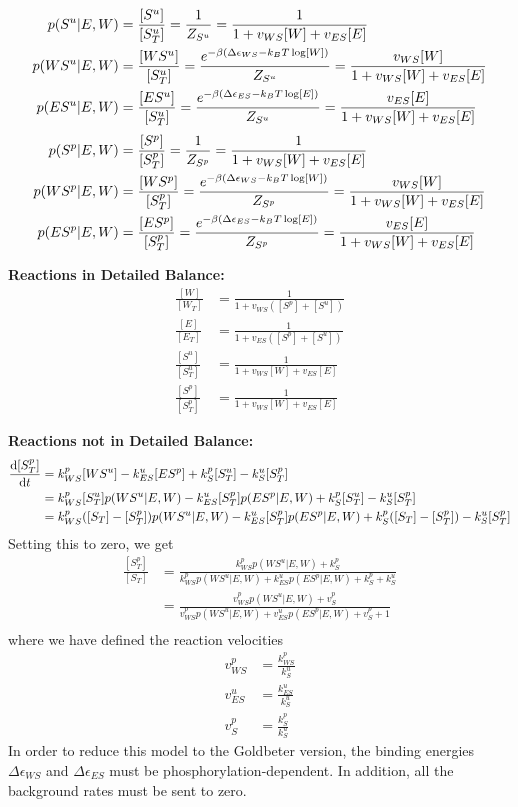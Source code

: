 \documentclass[aps,onecolumn,superscriptaddress,notitlepage]{revtex4-1}
\begin{document}
\begin{align}
p(S^u|E, W) &= \frac{[S^u]}{[S^u_T]} = \frac{1}{Z_{S^u}} = \frac{1}{1 + v_{WS}[W]+ v_{ES}[E]}\\
p(WS^u|E, W) &= \frac{[WS^u]}{[S^u_T]} = \frac{ e^{-\beta\qty(\Delta\epsilon_{WS} -k_BT \log[W])}}{Z_{S^u}} = \frac{v_{WS}[W]}{1 + v_{WS}[W]+ v_{ES}[E]}\\
p(ES^u|E, W) &= \frac{[ES^u]}{[S^u_T]} = \frac{ e^{-\beta\qty(\Delta\epsilon_{ES} -k_BT \log[E])}}{Z_{S^u}} = \frac{v_{ES}[E]}{1 + v_{WS}[W]+ v_{ES}[E]}
\end{align}
\begin{align}
p(S^p|E, W) &= \frac{[S^p]}{[S^p_T]} = \frac{1}{Z_{S^p}} = \frac{1}{1 + v_{WS}[W]+ v_{ES}[E]}\\
p(WS^p|E, W) &= \frac{[WS^p]}{[S^p_T]} = \frac{ e^{-\beta\qty(\Delta\epsilon_{WS} -k_BT \log[W])}}{Z_{S^p}} = \frac{v_{WS}[W]}{1 + v_{WS}[W]+ v_{ES}[E]}\\
p(ES^p|E, W) &= \frac{[ES^p]}{[S^p_T]} = \frac{ e^{-\beta\qty(\Delta\epsilon_{ES} -k_BT \log[E])}}{Z_{S^p}} = \frac{v_{ES}[E]}{1 + v_{WS}[W]+ v_{ES}[E]}
\end{align}

\textbf{Reactions in Detailed Balance:}
\begin{align}
\frac{[W]}{[W_T]} & = \frac{1}{1 + v_{WS}([S^p]+[S^u])}\\
\frac{[E]}{[E_T]} & = \frac{1}{1 + v_{ES}([S^p]+[S^u])}\\
\frac{[S^u]}{[S^u_T]} &= \frac{1}{1 + v_{WS}[W]+ v_{ES}[E]}\\
\frac{[S^p]}{[S^p_T]} &=  \frac{1}{1+ v_{WS}[W] + v_{ES}[E]}
\end{align}

\textbf{Reactions not in  Detailed Balance:}
\begin{align}
\dv{[S^p_T]}{t} &= k_{WS}^p[WS^u] - k_{ES}^u[ES^p] + k_S^p[S^u_T] - k_S^u[S^p_T] \\
&= k_{WS}^p[S^u_T]p(WS^u|E, W) - k_{ES}^u[S^p_T]p(ES^p|E, W) + k_S^p[S^u_T] - k_S^u[S^p_T]\\
&= k_{WS}^p([S_T]-[S^p_T])p(WS^u|E, W) - k_{ES}^u[S^p_T]p(ES^p|E, W) + k_S^p([S_T]-[S^p_T]) - k_S^u[S^p_T]
\end{align}
Setting this to zero, we get
\begin{align}
\frac{[S_T^p]}{[S_T]} &= \frac{k_{WS}^p p(WS^u|E,W) + k_S^p}{k_{WS}^p p(WS^u|E,W) + k_{ES}^u p(ES^p|E,W) + k_S^p + k_S^u}\\
 &= \frac{v_{WS}^p p(WS^u|E,W) + v_S^p}{v_{WS}^p p(WS^u|E,W) + v_{ES}^u p(ES^p|E,W) + v_S^p + 1}\\
\end{align}
where we have defined the reaction velocities
\begin{align}
v_{WS}^p &= \frac{k_{WS}^p}{k_S^u}\\
v_{ES}^u &= \frac{k_{ES}^u}{k_S^u}\\
v_S^p &= \frac{k_S^p}{k_S^u}
\end{align}
In order to reduce this model to the Goldbeter version, the binding energies $\Delta \epsilon_{WS}$ and $\Delta \epsilon_{ES}$ must be phosphorylation-dependent. In addition, all the background rates must be sent to zero.
\end{document}
